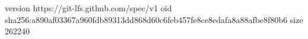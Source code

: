 version https://git-lfs.github.com/spec/v1
oid sha256:a890af03367a960fdb89313dd868d60c6feb457fe8ce8edafa8a88afbe8f80b6
size 262240
